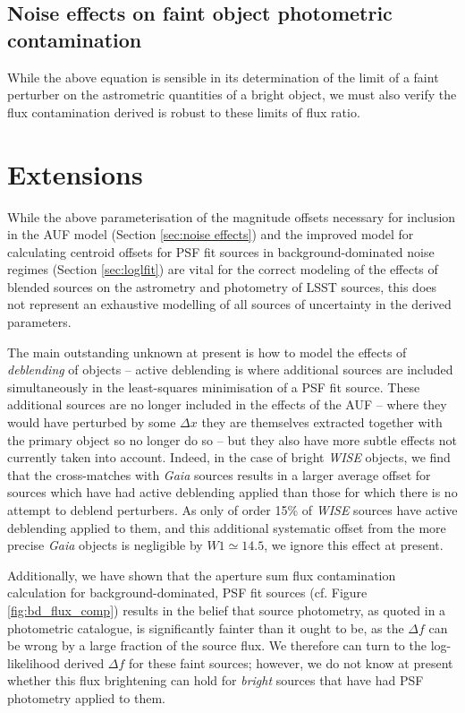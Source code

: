 \documentclass[fleqn,usenatbib]{mnras}
\begin{document}
\subsection{Noise effects on faint object photometric contamination}
While the above equation is sensible in its determination of the limit of a faint perturber on the astrometric quantities of a bright object, we must also verify the flux contamination derived is robust to these limits of flux ratio.


\section{Extensions}
While the above parameterisation of the magnitude offsets necessary for inclusion in the AUF model (Section \ref{sec:noise effects}) and the improved model for calculating centroid offsets for PSF fit sources in background-dominated noise regimes (Section \ref{sec:loglfit}) are vital for the correct modeling of the effects of blended sources on the astrometry and photometry of LSST sources, this does not represent an exhaustive modelling of all sources of uncertainty in the derived parameters.

The main outstanding unknown at present is how to model the effects of \textit{deblending} of objects -- active deblending is where additional sources are included simultaneously in the least-squares minimisation of a PSF fit source. These additional sources are no longer included in the effects of the AUF -- where they would have perturbed by some $\Delta x$ they are themselves extracted together with the primary object so no longer do so -- but they also have more subtle effects not currently taken into account. Indeed, in the case of bright \textit{WISE} objects, we find that the cross-matches with \textit{Gaia} sources results in a larger average offset for sources which have had active deblending applied than those for which there is no attempt to deblend perturbers. As only of order 15\% of \textit{WISE} sources have active deblending applied to them, and this additional systematic offset from the more precise \textit{Gaia} objects is negligible by $W1\simeq14.5$, we ignore this effect at present.

Additionally, we have shown that the aperture sum flux contamination calculation for background-dominated, PSF fit sources (cf. Figure \ref{fig:bd_flux_comp}) results in the belief that source photometry, as quoted in a photometric catalogue, is significantly fainter than it ought to be, as the $\Delta f$ can be wrong by a large fraction of the source flux. We therefore can turn to the log-likelihood derived $\Delta f$ for these faint sources; however, we do not know at present whether this flux brightening can hold for \textit{bright} sources that have had PSF photometry applied to them.
\end{document}

